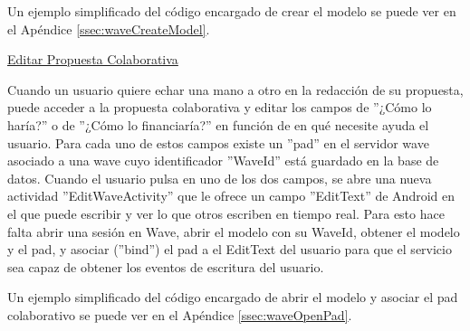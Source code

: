 		Un ejemplo simplificado del código encargado de crear el modelo se puede ver en el Apéndice \ref{ssec:waveCreateModel}.
		
		\underline{Editar Propuesta Colaborativa}

		Cuando un usuario quiere echar una mano a otro en la redacción de su propuesta, puede acceder a la propuesta colaborativa y editar los campos de ''¿Cómo lo haría?'' o de ''¿Cómo lo financiaría?'' en función de en qué necesite ayuda el usuario. Para cada uno de estos campos existe un ''pad'' en el servidor wave asociado a una wave cuyo identificador ''WaveId'' está guardado en la base de datos. Cuando el usuario pulsa en uno de los dos campos, se abre una nueva actividad ''EditWaveActivity'' que le ofrece un campo ''EditText'' de Android en el que puede escribir y ver lo que otros escriben en tiempo real. Para esto hace falta abrir una sesión en Wave, abrir el modelo con su WaveId, obtener el modelo y el pad, y asociar (''bind'') el pad a el EditText del usuario para que el servicio sea capaz de obtener los eventos de escritura del usuario.
		
		Un ejemplo simplificado del código encargado de abrir el modelo y asociar el pad colaborativo se puede ver en el Apéndice \ref{ssec:waveOpenPad}.
		
		

